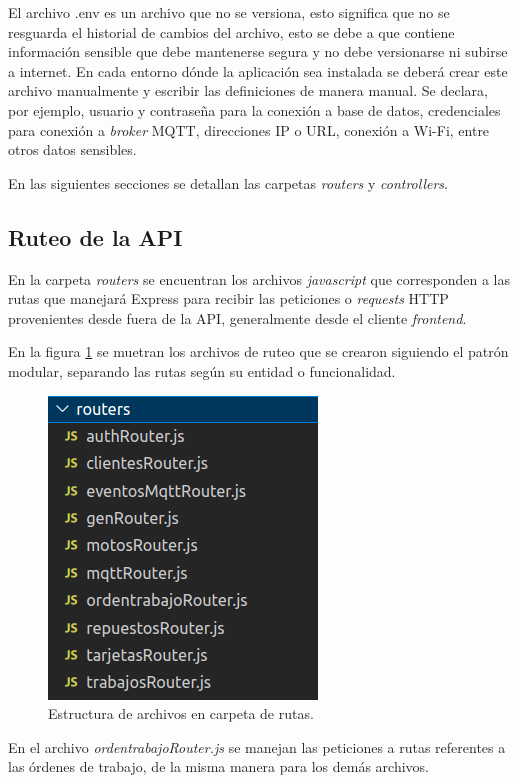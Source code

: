 El archivo .env es un archivo que no se versiona, esto significa que no se resguarda el historial de cambios del archivo, esto se debe a que contiene información sensible que debe mantenerse segura y no debe versionarse ni subirse a internet. En cada entorno dónde la aplicación sea instalada se deberá crear este archivo manualmente y escribir las definiciones de manera manual. Se declara, por ejemplo, usuario y contraseña para la conexión a base de datos, credenciales para conexión a \textit{broker} MQTT, direcciones IP o URL, conexión a Wi-Fi, entre otros datos sensibles.

En las siguientes secciones se detallan las carpetas \textit{routers} y \textit{controllers}.

\subsection{Ruteo de la API}
\label{subsec:apirouters}

En la carpeta \textit{routers} se encuentran los archivos \textit{javascript} que corresponden a las rutas que manejará Express para recibir las peticiones o \textit{requests} HTTP provenientes desde fuera de la API, generalmente desde el cliente \textit{frontend}.

En la figura \ref{fig:apiroutes} se muetran los archivos de ruteo que se crearon siguiendo el patrón modular, separando las rutas según su entidad o funcionalidad.

\begin{figure}[ht]
	\centering
	\includegraphics[scale=.50]{./Figures/api-routes.png}
	\caption{Estructura de archivos en carpeta de rutas.}
	\label{fig:apiroutes}
\end{figure}

En el archivo \textit{ordentrabajoRouter.js} se manejan las peticiones a rutas referentes a las órdenes de trabajo, de la misma manera para los demás archivos. 

